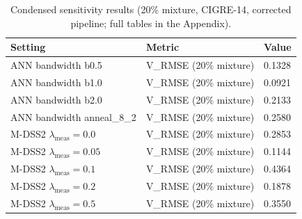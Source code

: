 \begin{table}[htbp]
\centering
\caption{Condensed sensitivity results (20\% mixture, CIGRE-14, corrected pipeline; full tables in the Appendix).}
\label{tab:sensitivity}
\footnotesize
\begin{tabular}{lll}
\toprule
Setting & Metric & Value \\
\midrule
ANN bandwidth b0.5 & V\_RMSE (20\% mixture) & 0.1328 \\
ANN bandwidth b1.0 & V\_RMSE (20\% mixture) & 0.0921 \\
ANN bandwidth b2.0 & V\_RMSE (20\% mixture) & 0.2133 \\
ANN bandwidth anneal\_8\_2 & V\_RMSE (20\% mixture) & 0.2580 \\
M-DSS2 $\lambda_{\mathrm{meas}}=0.0$ & V\_RMSE (20\% mixture) & 0.2853 \\
M-DSS2 $\lambda_{\mathrm{meas}}=0.05$ & V\_RMSE (20\% mixture) & 0.1144 \\
M-DSS2 $\lambda_{\mathrm{meas}}=0.1$ & V\_RMSE (20\% mixture) & 0.4364 \\
M-DSS2 $\lambda_{\mathrm{meas}}=0.2$ & V\_RMSE (20\% mixture) & 0.1878 \\
M-DSS2 $\lambda_{\mathrm{meas}}=0.5$ & V\_RMSE (20\% mixture) & 0.3550 \\
\bottomrule
\end{tabular}
\end{table}
